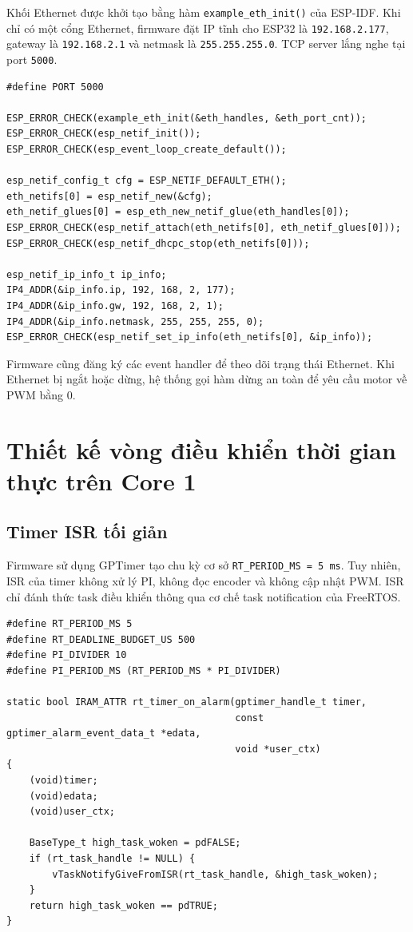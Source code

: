 \documentclass[12pt,a4paper]{report}
\begin{document}
Khối Ethernet được khởi tạo bằng hàm \texttt{example\_eth\_init()} của ESP-IDF. Khi chỉ có một cổng Ethernet, firmware đặt IP tĩnh cho ESP32 là \texttt{192.168.2.177}, gateway là \texttt{192.168.2.1} và netmask là \texttt{255.255.255.0}. TCP server lắng nghe tại port \texttt{5000}.

\begin{lstlisting}
#define PORT 5000

ESP_ERROR_CHECK(example_eth_init(&eth_handles, &eth_port_cnt));
ESP_ERROR_CHECK(esp_netif_init());
ESP_ERROR_CHECK(esp_event_loop_create_default());

esp_netif_config_t cfg = ESP_NETIF_DEFAULT_ETH();
eth_netifs[0] = esp_netif_new(&cfg);
eth_netif_glues[0] = esp_eth_new_netif_glue(eth_handles[0]);
ESP_ERROR_CHECK(esp_netif_attach(eth_netifs[0], eth_netif_glues[0]));
ESP_ERROR_CHECK(esp_netif_dhcpc_stop(eth_netifs[0]));

esp_netif_ip_info_t ip_info;
IP4_ADDR(&ip_info.ip, 192, 168, 2, 177);
IP4_ADDR(&ip_info.gw, 192, 168, 2, 1);
IP4_ADDR(&ip_info.netmask, 255, 255, 255, 0);
ESP_ERROR_CHECK(esp_netif_set_ip_info(eth_netifs[0], &ip_info));
\end{lstlisting}

Firmware cũng đăng ký các event handler để theo dõi trạng thái Ethernet. Khi Ethernet bị ngắt hoặc dừng, hệ thống gọi hàm dừng an toàn để yêu cầu motor về PWM bằng 0.

\section{Thiết kế vòng điều khiển thời gian thực trên Core 1}

\subsection{Timer ISR tối giản}

Firmware sử dụng GPTimer tạo chu kỳ cơ sở \texttt{RT\_PERIOD\_MS = 5 ms}. Tuy nhiên, ISR của timer không xử lý PI, không đọc encoder và không cập nhật PWM. ISR chỉ đánh thức task điều khiển thông qua cơ chế task notification của FreeRTOS.

\begin{lstlisting}
#define RT_PERIOD_MS 5
#define RT_DEADLINE_BUDGET_US 500
#define PI_DIVIDER 10
#define PI_PERIOD_MS (RT_PERIOD_MS * PI_DIVIDER)

static bool IRAM_ATTR rt_timer_on_alarm(gptimer_handle_t timer,
                                        const gptimer_alarm_event_data_t *edata,
                                        void *user_ctx)
{
    (void)timer;
    (void)edata;
    (void)user_ctx;

    BaseType_t high_task_woken = pdFALSE;
    if (rt_task_handle != NULL) {
        vTaskNotifyGiveFromISR(rt_task_handle, &high_task_woken);
    }
    return high_task_woken == pdTRUE;
}
\end{lstlisting}
\end{document}
